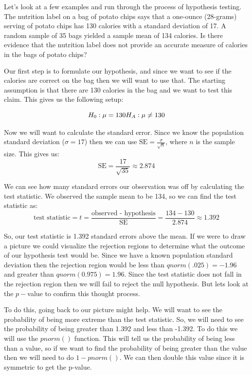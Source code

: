 \documentclass[
  letterpaper,
  DIV=11,
  numbers=noendperiod]{scrreprt}
\begin{document}
Let's look at a few examples and run through the process of hypothesis
testing. The nutrition label on a bag of potato chips says that a
one-ounce (28-grams) serving of potato chips has 130 calories with a
standard deviation of 17. A random sample of 35 bags yielded a sample
mean of 134 calories. Is there evidence that the nutrition label does
not provide an accurate measure of calories in the bags of potato chips?

Our first step is to formulate our hypothesis, and since we want to see
if the calories are correct on the bag then we will want to use that.
The starting assumption is that there are 130 calories in the bag and we
want to test this claim. This gives us the following setup:

\[ H_0: \mu = 130 \\ H_A: \mu \neq 130\]

Now we will want to calculate the standard error. Since we know the
population standard deviation (\(\sigma = 17\)) then we can use
\(\text{SE}=\frac{\sigma}{\sqrt{n}}\), where \(n\) is the sample size.
This gives us: \[ \text{SE} = \frac{17}{\sqrt{35}} \approx 2.874 \]

We can see how many standard errors our observation was off by
calculating the test statistic. We observed the sample mean to be 134,
so we can find the test statistic as:
\[ \text{test statistic} = t = \frac{\text{observed - hypothesis}}{\text{SE}} = \frac{134-130}{2.874} \approx 1.392\]

So, our test statistic is 1.392 standard errors above the mean. If we
were to draw a picture we could visualize the rejection regions to
determine what the outcome of our hypothesis test would be. Since we
have a known population standard deviation then the rejection region
would be less than \(qnorm(.025)=-1.96\) and greater than
\(qnorm(0.975)=1.96\). Since the test statistic does not fall in the
rejection region then we will fail to reject the null hypothesis. But
lets look at the \(p-\)value to confirm this thought process.

To do this, going back to our picture might help. We will want to see
the probability of being more extreme than the test statistic. So, we
will need to see the probability of being greater than 1.392 and less
than -1.392. To do this we will use the \(pnorm()\) function. This will
tell us the probability of being less than a value, so if we want to
find the probability of being greater than the value then we will need
to do \(1 - pnorm()\). We can then double this value since it is
symmetric to get the p-value.
\end{document}
